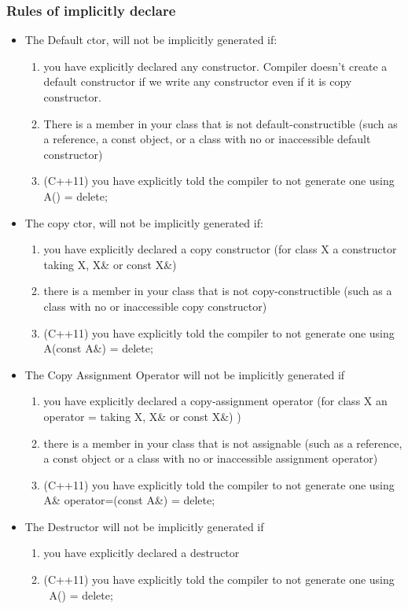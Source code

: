 \documentclass[a4paper,12pt,twoside]{book}
\begin{document}
\subsubsection{Rules of implicitly declare }
\begin{itemize}
\item The Default ctor, will not be implicitly generated if:
\begin{enumerate}
\item you have explicitly declared any constructor.  Compiler doesn't create a default constructor if we write any constructor even if it is copy constructor.
\item There is a member in your class that is not default-constructible (such as a reference, a const object, or a class with no or inaccessible default constructor)
\item (C++11) you have explicitly told the compiler to not generate one using A() = delete;
\end{enumerate}


\item The copy ctor, will not be implicitly generated if:
\begin{enumerate}
\item you have explicitly declared a copy constructor (for class X a constructor taking X, X\& or const X\&)
\item there is a member in your class that is not copy-constructible (such as a class with no or inaccessible copy constructor)
\item (C++11) you have explicitly told the compiler to not generate one using A(const A\&) = delete;
\end{enumerate}


\item The Copy Assignment Operator will not be implicitly generated if
\begin{enumerate}
\item you have explicitly declared a copy-assignment operator (for class X an operator = taking X, X\& or const X\&) )
\item there is a member in your class that is not assignable (such as a reference, a const object or a class with no or inaccessible assignment operator)
\item (C++11) you have explicitly told the compiler to not generate one using A\& operator=(const A\&) = delete;
\end{enumerate}


\item The Destructor will not be implicitly generated if
\begin{enumerate}
\item you have explicitly declared a destructor
\item (C++11) you have explicitly told the compiler to not generate one using ~A() = delete;
\end{enumerate}


\end{itemize}
\end{document}

